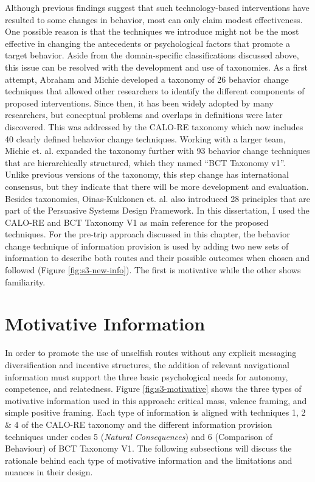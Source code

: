 Although previous findings suggest that such technology-based interventions have resulted to some changes in behavior, most can only claim modest effectiveness. One possible reason is that the techniques we introduce might not be the most effective in changing the antecedents or psychological factors that promote a target behavior. Aside from the domain-specific classifications discussed above, this issue can be resolved with the development and use of taxonomies. As a first attempt, Abraham and Michie developed a taxonomy of 26 behavior change techniques that allowed other researchers to identify the different components of proposed interventions\cite{abraham2008taxonomy}. Since then, it has been widely adopted by many researchers, but conceptual problems and overlaps in definitions were later discovered. This was addressed by the CALO-RE taxonomy which now includes 40 clearly defined behavior change techniques\cite{michie2011refined}. Working with a larger team, Michie et. al. expanded the taxonomy further with 93 behavior change techniques that are hierarchically structured, which they named ``BCT Taxonomy v1''\cite{michie2013behavior}. Unlike previous versions of the taxonomy, this step change has international consensus, but they indicate that there will be more development and evaluation. Besides taxonomies, Oinas-Kukkonen et. al. also introduced 28 principles that are part of the Persuasive Systems Design Framework\cite{oinas2009persuasive}. In this dissertation, I used the CALO-RE\cite{michie2011refined} and BCT Taxonomy V1\cite{michie2013behavior} as main reference for the proposed techniques. For the pre-trip approach discussed in this chapter, the behavior change technique of information provision is used by adding two new sets of information to describe both routes and their possible outcomes when chosen and followed (Figure \ref{fig:s3-new-info}). The first is motivative while the other shows familiarity. 

\section{Motivative Information}
In order to promote the use of unselfish routes without any explicit messaging diversification and incentive structures, the addition of relevant navigational information must support the three basic psychological needs for autonomy, competence, and relatedness. Figure \ref{fig:s3-motivative} shows the three types of motivative information used in this approach: critical mass, valence framing, and simple positive framing. Each type of information is aligned with techniques 1, 2 \& 4 of the CALO-RE taxonomy\cite{michie2011refined} and the different information provision techniques under codes 5 (\textit{Natural Consequences}) and 6 (Comparison of Behaviour) of BCT Taxonomy V1\cite{michie2013behavior}. The following subsections will discuss the rationale behind each type of motivative information and the limitations and nuances in their design.

